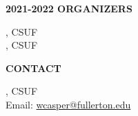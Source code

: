 \documentclass[a4paper]{article}
\begin{document}
\begin{minipage}{0.95\textwidth}
\begin{minipage}[b]{0.47\textwidth}
\medskip
\textbf{\color{csecondary}\large 2021-2022 ORGANIZERS}\par
{}, CSUF\\
, CSUF

\medskip

\textbf{\color{csecondary}\large CONTACT }\par

, CSUF\\
Email: \href{mailto:wcasper@fullerton.edu}{wcasper@fullerton.edu}

\rule{0pt}{78pt}
\end{minipage}
\vspace*{-70pt}

\end{minipage}
\end{document}
